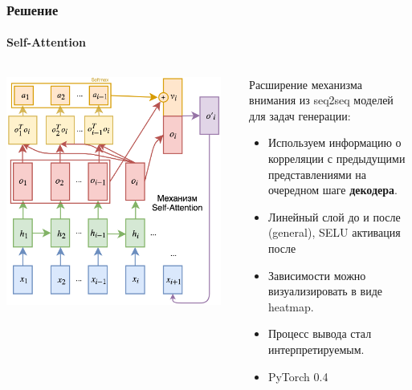 \documentclass[10pt]{beamer}
\begin{document}
\begin{frame}
\frametitle{Решение}
\framesubtitle{Self-Attention}


\begin{center}
    \begin{columns}
        \begin{column}{0.6\textwidth}
            \begin{center}
                \includegraphics[width=0.95\textwidth]{images/self_attention.png}
            \end{center}
        \end{column}
        \begin{column}{0.45\textwidth}
            Расширение механизма внимания из seq2seq моделей для задач генерации:
            \begin{itemize}
                \item Используем информацию о корреляции с предыдущими представлениями на очередном шаге \textbf{декодера}.
                \item Линейный слой до и после (general), SELU активация после
                \item Зависимости можно визуализировать в виде heatmap.
                \item Процесс вывода стал интерпретируемым.
                \item PyTorch 0.4
            \end{itemize}
        \end{column}
    \end{columns}
\end{center}

\end{frame}
\end{document}
